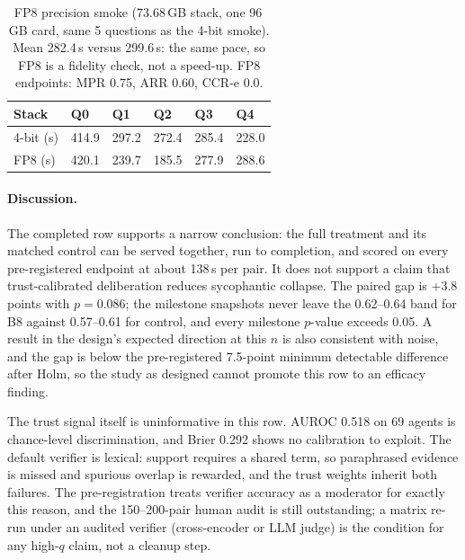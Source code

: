 \begin{table}[H]
  \centering
  \caption{FP8 precision smoke (73.68\,GB stack, one 96\,GB card, same 5 questions as the 4-bit smoke). Mean 282.4\,s versus 299.6\,s: the same pace, so FP8 is a fidelity check, not a speed-up. FP8 endpoints: MPR 0.75, ARR 0.60, CCR-e 0.0.}
  \renewcommand{\arraystretch}{1.25}
  \small
  \begin{tabular}{|p{}|p{}|p{}|p{}|p{}|p{}|}
    \hline
    Stack & Q0 & Q1 & Q2 & Q3 & Q4 \\
    \hline
    4-bit (s) & 414.9 & 297.2 & 272.4 & 285.4 & 228.0 \\
    \hline
    FP8 (s) & 420.1 & 239.7 & 185.5 & 277.9 & 288.6 \\
    \hline
  \end{tabular}
  \label{tab:core-fp8}
\end{table}

\paragraph*{Discussion.}
The completed row supports a narrow conclusion: the full treatment and its matched control can be served together, run to completion, and scored on every pre-registered endpoint at about 138\,s per pair. It does not support a claim that trust-calibrated deliberation reduces sycophantic collapse. The paired gap is +3.8 points with $p=0.086$; the milestone snapshots never leave the 0.62--0.64 band for B8 against 0.57--0.61 for control, and every milestone $p$-value exceeds 0.05. A result in the design's expected direction at this $n$ is also consistent with noise, and the gap is below the pre-registered 7.5-point minimum detectable difference after Holm, so the study as designed cannot promote this row to an efficacy finding.

The trust signal itself is uninformative in this row. AUROC 0.518 on 69 agents is chance-level discrimination, and Brier 0.292 shows no calibration to exploit. The default verifier is lexical: support requires a shared term, so paraphrased evidence is missed and spurious overlap is rewarded, and the trust weights inherit both failures. The pre-registration treats verifier accuracy as a moderator for exactly this reason, and the 150--200-pair human audit is still outstanding; a matrix re-run under an audited verifier (cross-encoder or LLM judge) is the condition for any high-$q$ claim, not a cleanup step.

